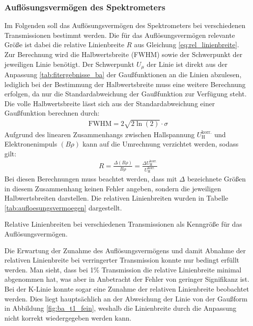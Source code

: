 \documentclass[11pt, a4paper]{article}
\numberwithin{equation}{section}
\begin{document}
\subsubsection{Auflösungsvermögen des Spektrometers}
Im Folgenden soll das Auflösungsvermögen des Spektrometers bei verschiedenen Transmissionen bestimmt werden.
Die für das Auflösungsvermögen relevante Größe ist dabei die relative Linienbreite $R$ aus Gleichung \eqref{eq:rel_linienbreite}.
Zur Berechnung wird die Halbwertsbreite (FWHM) sowie der Schwerpunkt der jeweiligen Linie benötigt.
Der Schwerpunkt $U_\mu$ der Linie ist direkt aus der Anpassung \ref{tab:fitergebnisse_ba} der Gaußfunktionen an die Linien abzulesen, lediglich bei der Bestimmung der Halbwertsbreite muss eine weitere Berechnung erfolgen, da nur die Standardabweichung der Gaußfunktion zur Verfügung steht.
Die volle Halbwertsbreite lässt sich aus der Standardabweichung einer Gaußfunktion berechnen durch:
\begin{align}
	\mathrm{FWHM} = 2 \sqrt{2\ln(2)} \cdot \sigma
\end{align}
Aufgrund des linearen Zusammenhangs zwischen Hallspannung $U_\mathrm{H}^\mathrm{korr.}$ und Elektronenimpuls $(B \rho)$ kann auf die Umrechnung verzichtet werden, sodass gilt:
\begin{align}
	R = \frac{\Delta (B \rho)}{B \rho} = \frac{\Delta U_\mathrm{H}^\mathrm{korr.}}{U_\mathrm{H}^\mathrm{korr.}}
\end{align}
Bei diesen Berechnungen muss beachtet werden, dass mit $\Delta$ bezeichnete Größen in diesem Zusammenhang keinen Fehler angeben, sondern die jeweiligen Halbwertsbreiten darstellen.
Die relativen Linienbreiten wurden in Tabelle \ref{tab:aufloesungsvermoegen} dargestellt.
\begin{table}[h]
	\centering
	
	\caption{Relative Linienbreiten bei verschiedenen Transmissionen als Kenngröße für das Auflösungsvermögen.}
	\label{tab:aufloesungsvermoegen}
\end{table}
Die Erwartung der Zunahme des Auflösungsvermögens und damit Abnahme der relativen Linienbreite bei verringerter Transmission konnte nur bedingt erfüllt werden.
Man sieht, dass bei 1\% Transmission die relative Linienbreite minimal abgenommen hat, was aber in Anbetracht der Fehler von geringer Signifikanz ist.
Bei der K-Linie konnte sogar eine Zunahme der relativen Linienbreite beobachtet werden.
Dies liegt hauptsächlich an der Abweichung der Linie von der Gaußform in Abbildung \ref{fig:ba_t1_fein}, weshalb die Linienbreite durch die Anpassung nicht korrekt wiedergegeben werden kann.
\newpage
\end{document}
